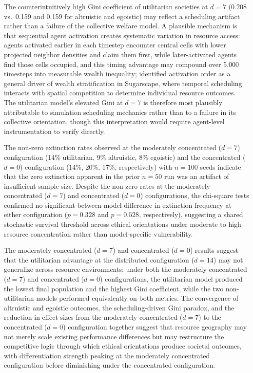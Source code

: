 \documentclass{icsthesis}
\begin{document}
\begin{mainmatter}
The counterintuitively high Gini coefficient of utilitarian societies at $d = 7$ (0.208 vs.\ 0.159 and 0.159 for altruistic and egoistic) may reflect a scheduling artifact rather than a failure of the collective welfare model. A plausible mechanism is that sequential agent activation creates systematic variation in resource access: agents activated earlier in each timestep encounter central cells with lower projected neighbor densities and claim them first, while later-activated agents find those cells occupied, and this timing advantage may compound over 5,000 timesteps into measurable wealth inequality; \citet{Hawick2014} identified activation order as a general driver of wealth stratification in Sugarscape, where temporal scheduling interacts with spatial competition to determine individual resource outcomes. The utilitarian model's elevated Gini at $d = 7$ is therefore most plausibly attributable to simulation scheduling mechanics rather than to a failure in its collective orientation, though this interpretation would require agent-level instrumentation to verify directly.

The non-zero extinction rates observed at the moderately concentrated ($d = 7$) configuration (14\% utilitarian, 9\% altruistic, 8\% egoistic) and the concentrated ($d = 0$) configuration (14\%, 20\%, 17\%, respectively) with $n = 100$ seeds indicate that the zero extinction apparent in the prior $n = 50$ run was an artifact of insufficient sample size. Despite the non-zero rates at the moderately concentrated ($d = 7$) and concentrated ($d = 0$) configurations, the chi-square tests confirmed no significant between-model difference in extinction frequency at either configuration ($p = 0.328$ and $p = 0.528$, respectively), suggesting a shared stochastic survival threshold across ethical orientations under moderate to high resource concentration rather than model-specific vulnerability.

The moderately concentrated ($d = 7$) and concentrated ($d = 0$) results suggest that the utilitarian advantage at the distributed configuration ($d = 14$) may not generalize across resource environments: under both the moderately concentrated ($d = 7$) and concentrated ($d = 0$) configurations, the utilitarian model produced the lowest final population and the highest Gini coefficient, while the two non-utilitarian models performed equivalently on both metrics. The convergence of altruistic and egoistic outcomes, the scheduling-driven Gini paradox, and the reduction in effect sizes from the moderately concentrated ($d = 7$) to the concentrated ($d = 0$) configuration together suggest that resource geography may not merely scale existing performance differences but may restructure the competitive logic through which ethical orientations produce societal outcomes, with differentiation strength peaking at the moderately concentrated configuration before diminishing under the concentrated configuration.


\end{mainmatter}
\end{document}
